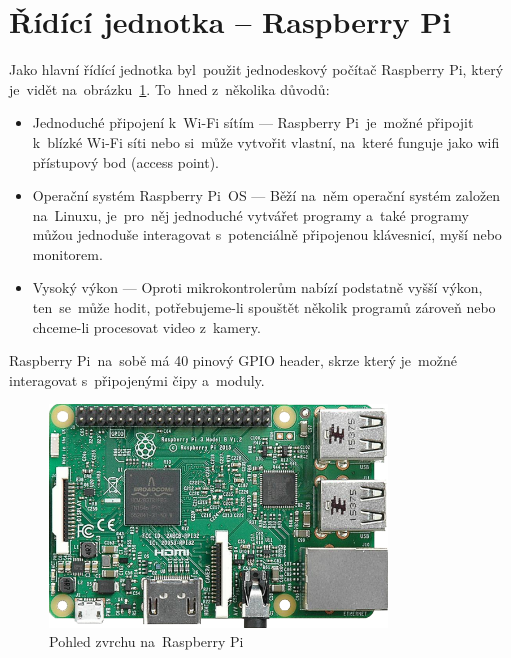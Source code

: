 \section{Řídící jednotka -- Raspberry Pi}
Jako hlavní řídící jednotka byl~použit jednodeskový počítač Raspberry Pi, který je~vidět na~obrázku~\ref{fig:RPi}. To~hned z~několika důvodů:
\begin{itemize}
  \item Jednoduché připojení k~Wi-Fi sítím --- Raspberry Pi~je~možné připojit k~blízké Wi-Fi síti nebo si~může vytvořit vlastní, na~které funguje jako wifi přístupový bod (access point).
  \item Operační systém Raspberry Pi~OS --- Běží na~něm operační systém založen na~Linuxu, je~pro~něj jednoduché vytvářet programy a~také programy můžou jednoduše interagovat s~potenciálně připojenou klávesnicí, myší nebo monitorem.
  \item Vysoký výkon --- Oproti mikrokontrolerům nabízí podstatně vyšší výkon, ten~se~může hodit, potřebujeme-li spouštět několik programů zároveň nebo chceme-li procesovat video z~kamery.
\end{itemize}
Raspberry Pi~na~sobě má 40 pinový GPIO header, skrze který je~možné interagovat s~připojenými čipy a~moduly.

\begin{figure}[htb]
    \centering
  \includegraphics[width=0.8\textwidth]{img/RPi.png}
  \caption{\label{fig:RPi} Pohled zvrchu na~Raspberry Pi~\cite{rpi-image}}
\end{figure}












